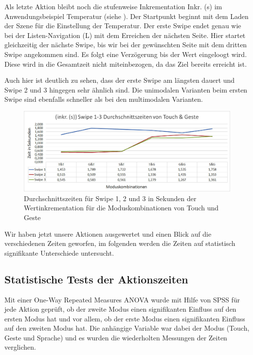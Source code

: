 Als letzte Aktion bleibt noch die stufenweise Inkrementation Inkr. (s) im Anwendungsbeispiel Temperatur (siehe ). 
Der Startpunkt beginnt mit dem Laden der Szene für die Einstellung der Temperatur. 
Der erste Swipe endet genau wie bei der Listen-Navigation (L) mit dem Erreichen der nächsten Seite. 
Hier startet gleichzeitig der nächste Swipe, bis wir bei der gewünschten Seite mit dem dritten Swipe angekommen sind. 
Es folgt eine Verzögerung bis der Wert eingeloogt wird. 
Diese wird in die Gesamtzeit nicht miteinbezogen, da das Ziel bereits erreicht ist. 

Auch hier ist deutlich zu sehen, dass der erste Swipe am längsten dauert und Swipe 2 und 3 hingegen sehr ähnlich sind. 
Die unimodalen Varianten beim ersten Swipe sind ebenfalls schneller als bei den multimodalen Varianten.
\begin{figure}[ht]
  \centering
  \includegraphics[width=1\textwidth]{img/Swipe1-3_Klima.JPG}
  \caption[Durchschnittszeiten für Inkr. (s)]{Durchschnittszeiten für Swipe 1, 2 und 3 in Sekunden der Wertinkrementation für die Moduskombinationen von Touch und Geste}
  \label{fig:SwipeKlima}
\end{figure} 

Wir haben jetzt unsere Aktionen ausgewertet und einen Blick auf die verschiedenen Zeiten geworfen, im folgenden werden die Zeiten auf  statistisch signifikante Unterschiede untersucht. 

\subsection[Statistische Tests]{Statistische Tests der Aktionszeiten}
Mit einer One-Way Repeated Measures ANOVA wurde mit Hilfe von SPSS für jede Aktion geprüft, ob der zweite Modus einen signifikanten Einfluss auf den ersten Modus hat und vor allem, ob der erste Modus einen signifikanten Einfluss auf den zweiten Modus hat. 
Die anhängige Variable war dabei der Modus (Touch, Geste und Sprache) und es wurden die wiederholten Messungen der Zeiten verglichen. 

